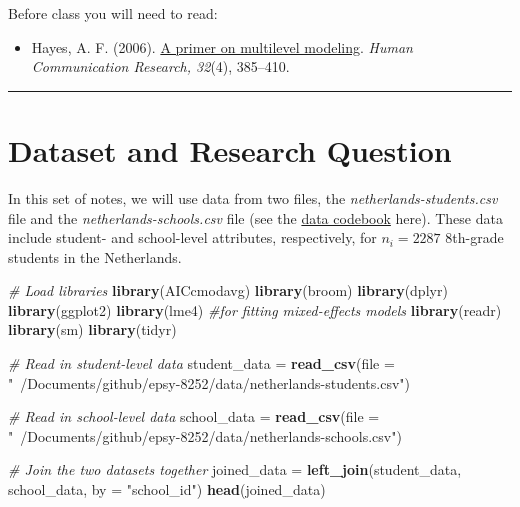 \documentclass[]{book}
\newenvironment{Shaded}{\begin{snugshade}}{\end{snugshade}}
\newcommand{\CommentTok}[1]{\textcolor[rgb]{0.56,0.35,0.01}{\textit{#1}}}
\newcommand{\DataTypeTok}[1]{\textcolor[rgb]{0.13,0.29,0.53}{#1}}
\newcommand{\KeywordTok}[1]{\textcolor[rgb]{0.13,0.29,0.53}{\textbf{#1}}}
\newcommand{\NormalTok}[1]{#1}
\newcommand{\StringTok}[1]{\textcolor[rgb]{0.31,0.60,0.02}{#1}}
\providecommand{\tightlist}{%
  \setlength{\itemsep}{0pt}\setlength{\parskip}{0pt}}
\begin{document}
Before class you will need to read:

\begin{itemize}
\tightlist
\item
  Hayes, A. F. (2006). \href{http://onlinelibrary.wiley.com/doi/10.1111/j.1468-2958.2006.00281.x/abstract}{A primer on multilevel modeling}. \emph{Human Communication Research, 32}(4), 385--410.
\end{itemize}

\begin{center}\rule{0.5\linewidth}{\linethickness}\end{center}

\hypertarget{dataset-and-research-question-7}{%
\section{Dataset and Research Question}\label{dataset-and-research-question-7}}

In this set of notes, we will use data from two files, the \emph{netherlands-students.csv} file and the \emph{netherlands-schools.csv} file (see the \protect\hyperlink{netherlands}{data codebook} here). These data include student- and school-level attributes, respectively, for \(n_i=2287\) 8th-grade students in the Netherlands.

\begin{Shaded}
\begin{Highlighting}[]
\CommentTok{# Load libraries}
\KeywordTok{library}\NormalTok{(AICcmodavg)}
\KeywordTok{library}\NormalTok{(broom)}
\KeywordTok{library}\NormalTok{(dplyr)}
\KeywordTok{library}\NormalTok{(ggplot2)}
\KeywordTok{library}\NormalTok{(lme4) }\CommentTok{#for fitting mixed-effects models}
\KeywordTok{library}\NormalTok{(readr)}
\KeywordTok{library}\NormalTok{(sm)}
\KeywordTok{library}\NormalTok{(tidyr)}

\CommentTok{# Read in student-level data}
\NormalTok{student_data =}\StringTok{ }\KeywordTok{read_csv}\NormalTok{(}\DataTypeTok{file =} \StringTok{"~/Documents/github/epsy-8252/data/netherlands-students.csv"}\NormalTok{)}

\CommentTok{# Read in school-level data}
\NormalTok{school_data =}\StringTok{ }\KeywordTok{read_csv}\NormalTok{(}\DataTypeTok{file =} \StringTok{"~/Documents/github/epsy-8252/data/netherlands-schools.csv"}\NormalTok{)}

\CommentTok{# Join the two datasets together}
\NormalTok{joined_data =}\StringTok{ }\KeywordTok{left_join}\NormalTok{(student_data, school_data, }\DataTypeTok{by =} \StringTok{"school_id"}\NormalTok{)}
\KeywordTok{head}\NormalTok{(joined_data)}
\end{Highlighting}
\end{Shaded}
\end{document}
